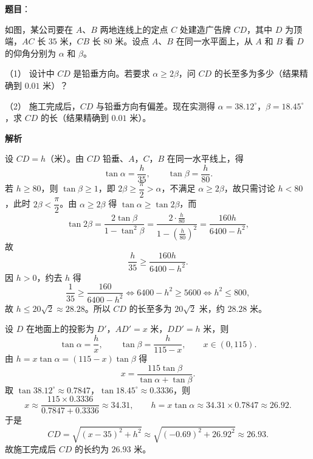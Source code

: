 \begin{answer}

\textbf{题目}：

如图，某公司要在 $A$、$B$ 两地连线上的定点 $C$ 处建造广告牌 $CD$，其中 $D$ 为顶端，$AC$ 长 $35$ 米，$CB$ 长 $80$ 米。设点 $A$、$B$ 在同一水平面上，从 $A$ 和 $B$ 看 $D$ 的仰角分别为 $\alpha$ 和 $\beta$。
\nopagebreak[4]
\begin{center}\end{center}
\nopagebreak[4]
（1） 设计中 $CD$ 是铅垂方向。若要求 $\alpha\geqslant2\beta$，问 $CD$ 的长至多为多少（结果精确到 $0.01$ 米）？

（2） 施工完成后，$CD$ 与铅垂方向有偏差。现在实测得 $\alpha=38.12^\circ$，$\beta=18.45^\circ$，求 $CD$ 的长（结果精确到 $0.01$ 米）。

\textbf{解析}


设 $CD=h$（米）。由 $CD$ 铅垂、$A$，$C$，$B$ 在同一水平线上，得
\nopagebreak[4]
\[\tan\alpha=\frac h{35},\qquad\tan\beta=\frac h{80}.\]
若 $h\geqslant80$，则 $\tan\beta\geqslant1$，即 $2\beta\geqslant\dfrac\pi2>\alpha$，不满足 $\alpha\geqslant2\beta$，故只需讨论 $h<80$，此时 $2\beta<\dfrac\pi2$。由 $\alpha\geqslant2\beta$ 得 $\tan\alpha\geqslant\tan2\beta$，而
\nopagebreak[4]
\[\tan2\beta=\frac{2\tan\beta}{1-\tan^2\beta}=\frac{2\cdot\frac h{80}}{1-\left(\frac h{80}\right)^2}=\frac{160h}{6400-h^2},\]
故
\nopagebreak[4]
\[\frac h{35}\geqslant\frac{160h}{6400-h^2}.\]
因 $h>0$，约去 $h$ 得
\nopagebreak[4]
\[\frac1{35}\geqslant\frac{160}{6400-h^2}\iff6400-h^2\geqslant5600\iff h^2\leqslant800,\]
故 $h\leqslant20\sqrt2\approx28.28$。所以 $CD$ 的长至多为 $20\sqrt2$ 米，约 $28.28$ 米。


设 $D$ 在地面上的投影为 $D'$，$AD'=x$ 米，$DD'=h$ 米，则
\nopagebreak[4]
\[\tan\alpha=\frac hx,\qquad\tan\beta=\frac h{115-x},\qquad x\in(0,115).\]
由 $h=x\tan\alpha=(115-x)\tan\beta$ 得
\nopagebreak[4]
\[x=\frac{115\tan\beta}{\tan\alpha+\tan\beta}.\]
取 $\tan38.12^\circ\approx0.7847$，$\tan18.45^\circ\approx0.3336$，则
\nopagebreak[4]
\[x\approx\frac{115\times0.3336}{0.7847+0.3336}\approx34.31,\qquad h=x\tan\alpha\approx34.31\times0.7847\approx26.92 .\]
于是
\nopagebreak[4]
\[CD=\sqrt{(x-35)^2+h^2}\approx\sqrt{(-0.69)^2+26.92^2}\approx26.93 .\]
故施工完成后 $CD$ 的长约为 $26.93$ 米。



\end{answer}

